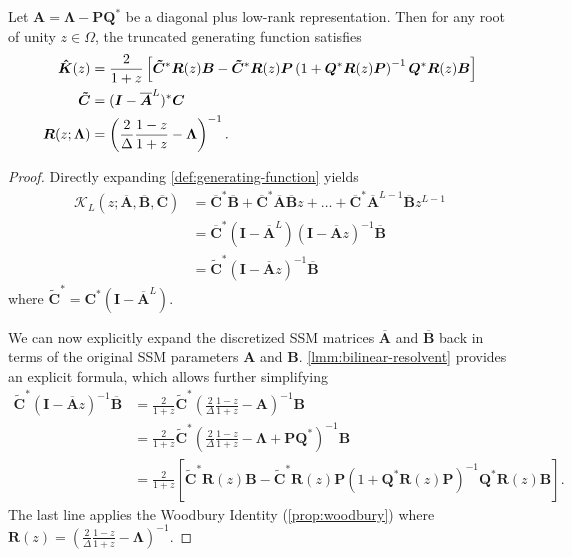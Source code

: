 \begin{lemma}%
  \label{lmm:resolvent-woodbury}
  Let \( \bm{A} = \bm{\Lambda} - \bm{P} \bm{Q}^* \) be a diagonal plus low-rank representation.
  Then for any root of unity \( z \in \Omega \), the truncated generating function satisfies
  \begin{align*}
    \bm{\hat{K}}(z) &=
    \frac{2}{1+z}\left[ \bm{\tilde{C}}^* \bm{R}(z) \bm{B} - \bm{\tilde{C}}^* \bm{R}(z) \bm{P} \left( 1 + \bm{Q}^* \bm{R}(z) \bm{P} \right)^{-1} \bm{Q}^* \bm{R}(z) \bm{B} \right]
    \\
    \bm{\tilde{C}} &= (\bm{I}-\bm{\overline{A}}^L)^* \bm{C}
    \\
    \bm{R}(z; \bm{\Lambda}) &= \left(\frac{2}{\Delta} \frac{1-z}{1+z} - \bm{\Lambda}\right)^{-1}
    .
  \end{align*}
\end{lemma}
%
\begin{proof}%
  Directly expanding \cref{def:generating-function} yields
  \begin{align*}
    \mathcal{K}_L(z; \bm{\overline{A}}, \bm{\overline{B}}, \bm{\overline{C}})
    &=
    \bm{\overline{C}}^* \bm{\overline{B}} + \bm{\overline{C}}^* \bm{\overline{A}} \bm{\overline{B}} z + \dots + \bm{\overline{C}}^* \bm{\overline{A}}^{L-1} \bm{\overline{B}} z^{L-1}
    \\&=
    \bm{\overline{C}}^* \left(\bm{I}-\bm{\overline{A}}^L\right) \left(\bm{I} - \bm{\overline{A}} z\right)^{-1} \bm{\overline{B}}
    \\&=
    \bm{\tilde{C}}^* \left(\bm{I} - \bm{\overline{A}} z\right)^{-1} \bm{\overline{B}}
  \end{align*}
  where \(  \bm{\tilde{C}}^* = \bm{C}^* \left(\bm{I}-\bm{\overline{A}}^L\right) \).

  We can now explicitly expand the discretized SSM matrices \( \bm{\overline{A}} \) and \( \bm{\overline{B}} \) back in terms of the original SSM parameters \( \bm{A} \) and \( \bm{B} \).
  \cref{lmm:bilinear-resolvent} provides an explicit formula, which allows further simplifying
  \begin{align*}
    \bm{\tilde{C}}^* \left(\bm{I} - \bm{\overline{A}} z\right)^{-1} \bm{\overline{B}}
    &= \frac{2}{1+z} \bm{\tilde{C}}^* \left(\frac{2}{\Delta} \frac{1-z}{1+z} - \bm{A}\right)^{-1}  \bm{B}
    \\&=
    \frac{2}{1+z} \bm{\tilde{C}}^* \left(\frac{2}{\Delta} \frac{1-z}{1+z} - \bm{\Lambda} + \bm{P}\bm{Q}^* \right)^{-1} \bm{B}
    \\&=
    \frac{2}{1+z}\left[ \bm{\tilde{C}}^* \bm{R}(z) \bm{B} - \bm{\tilde{C}}^* \bm{R}(z) \bm{P} \left( 1 + \bm{Q}^* \bm{R}(z) \bm{P} \right)^{-1} \bm{Q}^* \bm{R}(z) \bm{B} \right]
    .
  \end{align*}
  The last line applies the Woodbury Identity (\cref{prop:woodbury}) where \( \bm{R}(z) = \left(\frac{2}{\Delta} \frac{1-z}{1+z} - \bm{\Lambda}\right)^{-1} \).
\end{proof}


